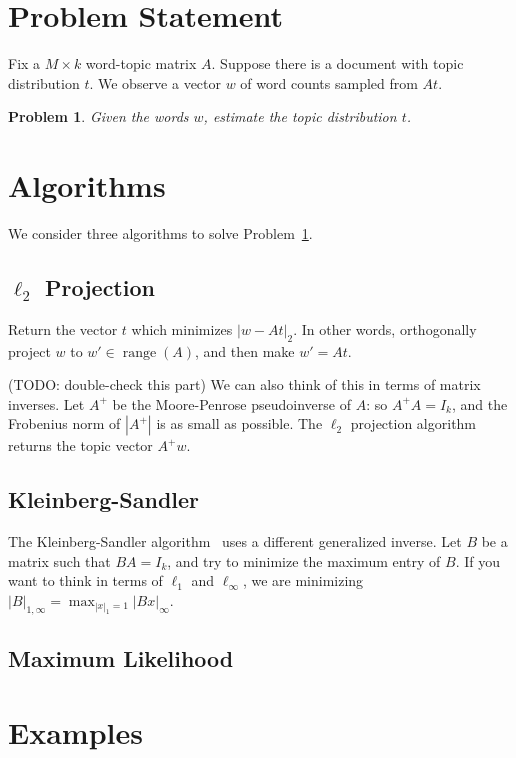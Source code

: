\documentclass{article}
\DeclareMathOperator{\Range}{range}
\newtheorem{Problem}{Problem}
\begin{document}
\section{Problem Statement}

Fix a \(M \times k\) word-topic matrix \(A\).
Suppose there is a document with topic distribution \(t\).
We observe a vector \(w\) of word counts sampled from \(At\).
\begin{Problem}
    \label{Problem:InferTopics}
    Given the words \(w\), estimate the topic distribution \(t\).
\end{Problem}

\section{Algorithms}

We consider three algorithms to solve Problem~\ref{Problem:InferTopics}.

\subsection{\(\ell_2\) Projection}

Return the vector \(t\) which minimizes \(|w - A t|_2\).
In other words, orthogonally project \(w\) to \(w' \in \Range(A)\), and then make \(w' = A t\).

(TODO: double-check this part)
We can also think of this in terms of matrix inverses.
Let \(A^+\) be the Moore-Penrose pseudoinverse of \(A\): so \(A^+A = I_k\), and the Frobenius norm of \(|A^+|\) is as small as possible.
The \(\ell_2\) projection algorithm returns the topic vector \(A^+w\).

\subsection{Kleinberg-Sandler}

The Kleinberg-Sandler algorithm~\cite{kleinberg2004using} uses a different generalized inverse.
Let \(B\) be a matrix such that \(BA = I_k\), and try to minimize the maximum entry of \(B\).
If you want to think in terms of \(\ell_1\) and \(\ell_\infty\), we are minimizing \(|B|_{1,\infty} = \max_{|x|_1 = 1} |B x|_\infty\).


\subsection{Maximum Likelihood}


\section{Examples}


{}

\end{document}
